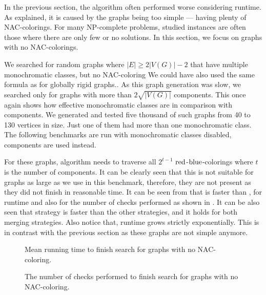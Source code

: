 In the previous section, the \Subgraphs{} algorithm
often performed worse considering runtime.
As explained, it is caused by the graphs being too simple
--- having plenty of NAC-colorings.
%
For many NP-complete problems, studied instances are often
those where there are only few or no solutions.
In this section, we focus on graphs with no NAC-colorings.

We searched for random graphs where \( |E| \ge 2|V(G)| - 2 \) that have
multiple monochromatic classes, but no NAC-coloring
{We could have also used the same formula as for globally rigid graphs.}.
%
As this graph generation was slow, we searched only for
graphs with more than \( 2\sqrt{|V(G)|} \) \trcon{} components.
%
This once again shows how effective monochromatic classes are
in comparison with \trcon{} components.
We generated and tested five thousand of such graphs from 40 to 130 vertices in size.
Just one of them had more than one monochromatic class.
%
The following benchmarks are run with monochromatic classes disabled,
\trcon{} components are used instead.

For these graphs, \NaiveCycles{} algorithm needs to traverse all \( 2^{t-1} \) \(\text{red}\)-\(\text{blue}\)-colorings
where \( t \) is the number of \trcon{} components. It can be clearly seen that
this is not suitable for graphs as large as we use in this benchmark,
therefore, they are not present as they did not finish in reasonable time.
It can be seen from 
that \SharedVertices{} is faster than \MergeLinear{},
for runtime and also for the number of checks performed
as shown in .
%
It can be also seen that \NeighborsDegree{} strategy is
faster than the other strategies, and it holds for both merging strategies.
Also notice that,
runtime grows strictly exponentially.
This is in contrast with the previous section
as these graphs are not simple anymore.

\begin{figure}[thbp]
	\centering
	\scalebox{\BenchFigureScale}{}
	\caption[Mean runtime for graphs with no NAC-coloring]{
		Mean running time to finish search for graphs with no NAC-coloring.}%
	\label{fig:graph_no_nac_coloring_first_runtime}
\end{figure}%
\begin{figure}[thbp]
	\centering
	\scalebox{\BenchFigureScale}{}
	\caption[Checks performed for graphs with no NAC-coloring]{
		The number of checks performed to finish search for graphs with no NAC-coloring.}%
	\label{fig:graph_no_nac_coloring_first_checks}
\end{figure}%

